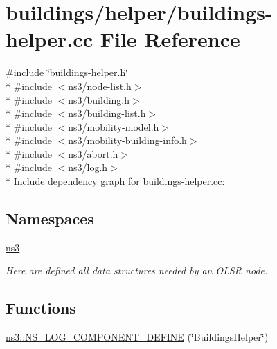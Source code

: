 \hypertarget{buildings-helper_8cc}{}\section{buildings/helper/buildings-\/helper.cc File Reference}
\label{buildings-helper_8cc}
{\ttfamily \#include \char`\"{}buildings-\/helper.\+h\char`\"{}}\\*
{\ttfamily \#include $<$ns3/node-\/list.\+h$>$}\\*
{\ttfamily \#include $<$ns3/building.\+h$>$}\\*
{\ttfamily \#include $<$ns3/building-\/list.\+h$>$}\\*
{\ttfamily \#include $<$ns3/mobility-\/model.\+h$>$}\\*
{\ttfamily \#include $<$ns3/mobility-\/building-\/info.\+h$>$}\\*
{\ttfamily \#include $<$ns3/abort.\+h$>$}\\*
{\ttfamily \#include $<$ns3/log.\+h$>$}\\*
Include dependency graph for buildings-\/helper.cc\+:
\subsection*{Namespaces}
\begin{DoxyCompactItemize}
\item 
 \hyperlink{namespacens3}{ns3}
\begin{DoxyCompactList}\small\item\em Here are defined all data structures needed by an O\+L\+SR node. \end{DoxyCompactList}\end{DoxyCompactItemize}
\subsection*{Functions}
\begin{DoxyCompactItemize}
\item 
\hyperlink{namespacens3_a4a5a3e8da7ef455447ce95ba806d5c06}{ns3\+::\+N\+S\+\_\+\+L\+O\+G\+\_\+\+C\+O\+M\+P\+O\+N\+E\+N\+T\+\_\+\+D\+E\+F\+I\+NE} (\char`\"{}Buildings\+Helper\char`\"{})
\end{DoxyCompactItemize}
